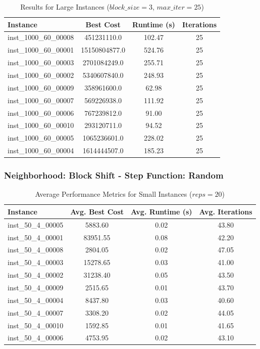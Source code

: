 \documentclass{article}
\begin{document}
\begin{table}[H]
\centering
\caption{Results for Large Instances ($block\_size=3$, $max\_iter=25$)}
\begin{tabular}{lccc}
\toprule
\textbf{Instance} & \textbf{Best Cost} & \textbf{Runtime (s)} & \textbf{Iterations} \\
\midrule
inst\_1000\_60\_00008 & 451231110.0     & 102.47 & 25 \\
inst\_1000\_60\_00001 & 15150804877.0   & 524.76 & 25 \\
inst\_1000\_60\_00003 & 2701084249.0    & 255.71 & 25 \\
inst\_1000\_60\_00002 & 5340607840.0    & 248.93 & 25 \\
inst\_1000\_60\_00009 & 358961600.0     & 62.98  & 25 \\
inst\_1000\_60\_00007 & 569226938.0     & 111.92 & 25 \\
inst\_1000\_60\_00006 & 767239812.0     & 91.00  & 25 \\
inst\_1000\_60\_00010 & 293120711.0     & 94.52  & 25 \\
inst\_1000\_60\_00005 & 1065236601.0    & 228.02 & 25 \\
inst\_1000\_60\_00004 & 1614444507.0    & 185.23 & 25 \\
\bottomrule
\end{tabular}
\label{tab:results_1000_60}
\end{table}
\subsubsection*{Neighborhood: Block Shift - Step Function: Random}

\begin{table}[H]
\centering
\caption{Average Performance Metrics for Small Instances ($reps=20$)}
\begin{tabular}{lccc}
\toprule
\textbf{Instance} & \textbf{Avg. Best Cost} & \textbf{Avg. Runtime (s)} & \textbf{Avg. Iterations} \\
\midrule
inst\_50\_4\_00005 & 5883.60  & 0.02 & 43.80 \\
inst\_50\_4\_00001 & 83951.55 & 0.08 & 42.20 \\
inst\_50\_4\_00008 & 2804.05  & 0.02 & 47.05 \\
inst\_50\_4\_00003 & 15278.65 & 0.03 & 41.00 \\
inst\_50\_4\_00002 & 31238.40 & 0.05 & 43.50 \\
inst\_50\_4\_00009 & 2515.65  & 0.01 & 43.70 \\
inst\_50\_4\_00004 & 8437.80  & 0.03 & 40.60 \\
inst\_50\_4\_00007 & 3308.20  & 0.02 & 44.05 \\
inst\_50\_4\_00010 & 1592.85  & 0.01 & 41.65 \\
inst\_50\_4\_00006 & 4753.95  & 0.02 & 43.10 \\
\bottomrule
\end{tabular}
\label{tab:avg_metrics_50_4}
\end{table}
\end{document}
